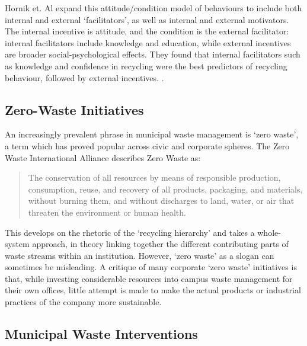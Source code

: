 \documentclass[nofonts,nols,justified,nobib]{tufte-book}
\begin{document}
Hornik et. Al expand this attitude/condition model of behaviours to include both internal and external `facilitators', as well as internal and external motivators. The internal incentive is attitude, and the condition is the external facilitator: internal facilitators include knowledge and education, while external incentives are broader social-psychological effects. They found that internal facilitators such as knowledge and confidence in recycling were the best predictors of recycling behaviour, followed by external incentives. \cite{Hornik_determinants_1995}.

\subsection*{Zero-Waste Initiatives}

An increasingly prevalent phrase in municipal waste management is `zero waste', a term which has proved popular across civic and corporate spheres. The Zero Waste International Alliance describes Zero Waste as:

\begin{quote}
The conservation of all resources by means of responsible production, consumption, reuse, and recovery of all products, packaging, and materials, without burning them, and without discharges to land, water, or air that threaten the environment or human health. 
\cite{zero_waste_international_alliance_zero_2017}
\end{quote}

This develops on the rhetoric of the `recycling hierarchy' and takes a whole-system approach, in theory linking together the different contributing parts of waste streams within an institution. However, `zero waste' as a slogan can sometimes be misleading. A critique of many corporate `zero waste' initiatives is that, while investing considerable resources into campus waste management for their own offices, little attempt is made to make the actual products or industrial practices of the company more sustainable.




\subsection*{Municipal Waste Interventions}
\end{document}

